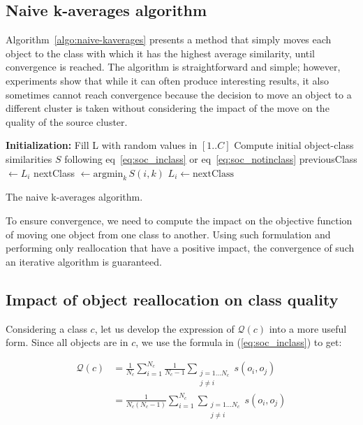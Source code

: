 \documentclass[natbib,smallextended]{svjour3}
\begin{document}
\subsection{Naive k-averages algorithm}

Algorithm~\ref{algo:naive-kaverages} presents a method that simply moves each object to the class with which it has the highest average similarity, until convergence is reached. The algorithm is straightforward and simple; however, experiments show that while it can often produce interesting results, it also sometimes cannot reach convergence because the decision to move an object to a different cluster is taken without considering the impact of the move on the quality of the source cluster.

\begin{algorithm}
	\label{algo:naive-kaverages}
	\SetAlgoLined
	\BlankLine
	\textbf{Initialization:}
		Fill L with random values in $[1..C]$\;
		Compute initial object-class similarities $S$ following eq~\ref{eq:soc_inclass} or eq~\ref{eq:soc_notinclass}\;
	\BlankLine
	 {
		 {
			previousClass $\leftarrow L_i$\;
			nextClass $\leftarrow \mathrm{argmin}_k\, S(i, k)$
			 {
				$L_i \leftarrow \mathrm{nextClass}$\;
			}
		}
	}
	\BlankLine
	\caption{The naive k-averages algorithm.}
\end{algorithm}

To ensure convergence, we need to compute the impact on the objective function of moving one object from one class to another. Using such formulation and performing only reallocation that have a positive impact, the convergence of such an iterative algorithm is guaranteed.

\subsection{Impact of object reallocation on class quality}

Considering a class $c$, let us develop the expression of $\mathcal{Q}(c)$ into a more useful form. Since all objects are in $c$, we use the formula in (\ref{eq:soc_inclass}) to get:

\begin{equation*}
  \begin{aligned}
    \mathcal{Q}\left(c\right) & = \frac{1}{N_c} \sum_{i=1}^{N_c} \frac{1}{N_c-1} \sum_{\substack{j=1 \ldots N_c\\j \neq i}} s\left(o_i, o_j\right) \\
                              & = \frac{1}{N_c(N_c-1)} \sum_{i=1}^{N_c} \sum_{\substack{j=1 \ldots N_c\\j \neq i}} s\left(o_i, o_j\right)
  \end{aligned}
\end{equation*}
\end{document}

